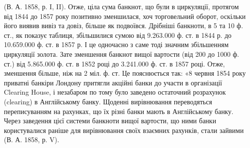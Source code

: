 (В. А. 1858, р. I, II). Отже, ціла сума банкнот, що були в циркуляції, протягом
від 1844 до 1857 року позитивно зменшилася, хоч торговельний оборот,
оскільки його виявив вивіз та довіз, більше як подвоївся. Дрібніші банкноти,
в 5 та 10 ф. ст., як показує таблиця, збільшилися сумою від 9.263.000 ф. ст.
в 1844 р. до 10.659.000 ф. ст. в 1857 р. І це одночасно з саме тоді значним
збільшенням циркуляції золота. Зате зменшення банкнот вищої вартости (від
200 до 1000 ф. ст.) від 5.865.000 ф. ст. в 1852 році до 3.241.000 ф. ст. в
1857 році. Отже, зменшення більше, ніж на 2  міл. ф. ст. Це пояснюється
так: «8 червня 1854 року приватні банкіри Лондону притягли акційні банки
до участи в організації Clearing House, і незабаром по тому було заведено
остаточний розрахунок (clearing) в Англійському банку. Щоденні вирівнювання
переводяться переписуванням на рахунках, що їх різні банки мають в Англійському
банку. Через заведення цієї системи банкноти вищої вартости, що ними
банки користувалися раніше для вирівнювання своїх взаємних рахунків, стали
зайвими (В. А. 1858, р. V).
